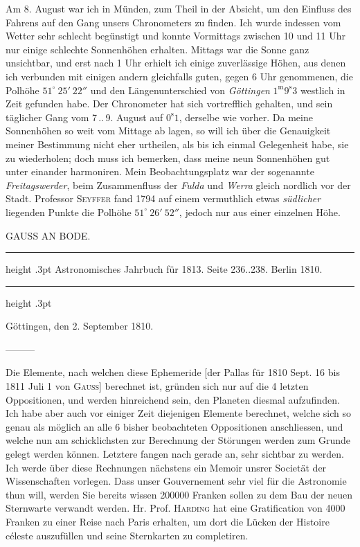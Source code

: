 Am 8. August war ich in Münden, zum Theil in der Absicht, um den Einfluss des Fahrens auf den Gang unsers Chronometers zu finden. Ich wurde indessen vom Wetter sehr schlecht begünstigt und konnte Vormittags zwischen 10 und 11 Uhr nur einige schlechte Sonnenhöhen erhalten. Mittags war die Sonne ganz unsichtbar, und erst nach 1 Uhr erhielt ich einige zuverlässige Höhen, aus denen ich verbunden mit einigen andern gleichfalls guten, gegen 6 Uhr genommenen, die Polhöhe $51^\circ\ 25'\ 22''$ und den Längenunterschied von \emph{Göttingen} $1^{\text{m}}9^{\text{s}}3$ westlich in Zeit gefunden habe. Der Chronometer hat sich vortrefflich gehalten, und sein täglicher Gang vom 7\,..\,9. August auf $0^{\text{s}}1$, derselbe wie vorher. Da meine Sonnenhöhen so weit vom Mittage ab lagen, so will ich über die Genauigkeit meiner Bestimmung nicht eher urtheilen, als bis ich einmal Gelegenheit habe, sie zu wiederholen; doch muss ich bemerken, dass meine neun Sonnenhöhen gut unter einander harmoniren. Mein Beobachtungsplatz war der sogenannte \emph{Freitagswerder}, beim Zusammenfluss der \emph{Fulda} und \emph{Werra} gleich nordlich  vor der Stadt. Professor \textsc{Seyffer} fand 1794 auf einem vermuthlich etwas \emph{südlicher} liegenden Punkte die Polhöhe $51^\circ\ 26'\ 52''$, jedoch nur aus einer einzelnen Höhe.
\par\medskip
{}
\begin{center}
{\large GAUSS AN BODE.\par}\smallskip
\parbox{.70\linewidth}{%
\centering\fontsize{8.2}{10.2}\selectfont
\hrule height .3pt\relax\vspace{2.5pt}
Astronomisches Jahrbuch für 1813. Seite 236..238. Berlin 1810.\par
\vspace{2.5pt}\hrule height .3pt\relax
}
\end{center}
\noindent\hfill Göttingen, den 2. September 1810.\par\smallskip

\par\indent ---\enspace---\enspace---

\par\indent Die Elemente, nach welchen diese Ephemeride [der Pallas für 1810 Sept. 16 bis 1811 Juli 1 von \textsc{Gauss}] berechnet ist, gründen sich nur auf die 4 letzten Oppositionen, und werden hinreichend sein, den Planeten diesmal aufzufinden. Ich habe aber auch vor einiger Zeit diejenigen Elemente berechnet, welche sich so genau als möglich an alle 6 bisher beobachteten Oppositionen anschliessen, und welche nun am schicklichsten zur Berechnung der Störungen werden zum Grunde gelegt werden können. Letztere fangen nach gerade an, sehr sichtbar zu werden. Ich werde über diese Rechnungen nächstens ein Memoir unsrer Societät der Wissenschaften vorlegen. Dass unser Gouvernement sehr viel für die Astronomie thun will, werden Sie bereits wissen 200000 Franken sollen zu dem Bau der neuen Sternwarte verwandt werden. Hr. Prof. \textsc{Harding} hat eine Gratification von 4000 Franken zu einer Reise nach Paris erhalten, um dort die Lücken der Histoire céleste auszufüllen und seine Sternkarten zu completiren.

